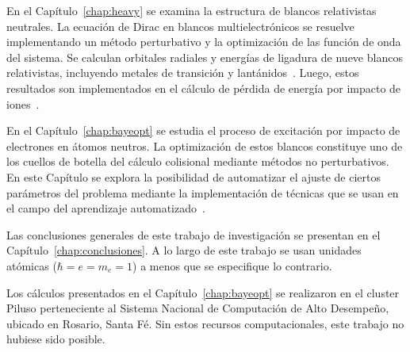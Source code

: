 En el Capítulo~\ref{chap:heavy} se examina la estructura de blancos 
relativistas neutrales. La ecuación de Dirac en blancos 
multielectrónicos se resuelve implementando un método perturbativo y la 
optimización de las función de onda del sistema. Se calculan orbitales 
radiales y energías de ligadura de nueve blancos relativistas, 
incluyendo metales de transición y lantánidos~\cite{Mendez:19relat}. 
Luego, estos resultados son implementados en el cálculo de pérdida de 
energía por impacto de iones~\cite{Montanari:20}.

En el Capítulo~\ref{chap:bayeopt} se estudia el proceso de excitación
por impacto de electrones en átomos neutros. La optimización de estos 
blancos constituye uno de los cuellos de botella del cálculo colisional 
mediante métodos no perturbativos. En este Capítulo se explora la 
posibilidad de automatizar el ajuste de ciertos parámetros del problema 
mediante la implementación de técnicas que se usan en el campo del 
aprendizaje automatizado~\cite{Mendez:20baye,Mendez:prep}.

Las conclusiones generales de este trabajo de investigación se presentan 
en el Capítulo~\ref{chap:conclusiones}.
A lo largo de este trabajo se usan unidades atómicas ($\hbar=e=m_e=1$)
a menos que se especifique lo contrario.


Los cálculos presentados en el Capítulo~\ref{chap:bayeopt} se realizaron 
en el cluster Piluso perteneciente al Sistema Nacional de Computación de 
Alto Desempeño, ubicado en Rosario, Santa Fé. Sin estos recursos 
computacionales, este trabajo no hubiese sido posible.

